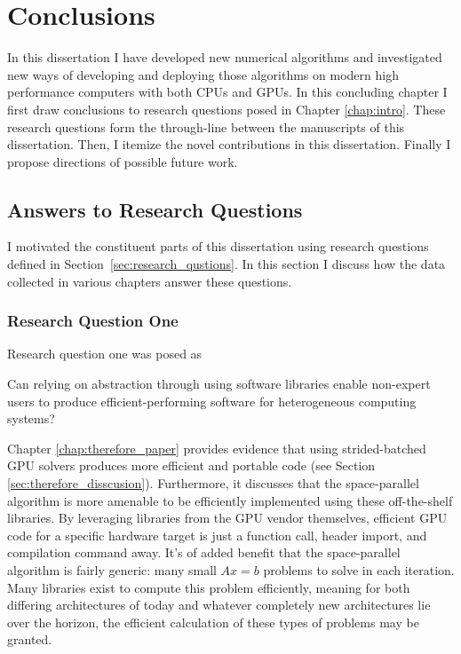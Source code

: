 
\chapter{Conclusions}
\label{chap:conclusion}


In this dissertation I have developed new numerical algorithms and investigated new ways of developing and deploying those algorithms on modern high performance computers with both CPUs and GPUs.
In this concluding chapter I first draw conclusions to research questions posed in Chapter \ref{chap:intro}.
These research questions form the through-line between the manuscripts of this dissertation.
Then, I itemize the novel contributions in this dissertation.
Finally I propose directions of possible future work.

\section{Answers to Research Questions}

I motivated the constituent parts of this dissertation using research questions defined in Section~\ref{sec:research_qustions}.
In this section I discuss how the data collected in various chapters answer these questions.

\subsection{Research Question One}

Research question one was posed as
\begin{displayquote}
Can relying on abstraction through using software libraries enable non-expert users to produce efficient-performing software for heterogeneous computing systems?
\end{displayquote}

Chapter \ref{chap:therefore_paper} provides evidence that using strided-batched GPU solvers produces more efficient and portable code (see Section \ref{sec:therefore_disscusion}).
Furthermore, it discusses that the space-parallel algorithm is more amenable to be efficiently implemented using these off-the-shelf libraries.
By leveraging libraries from the GPU vendor themselves, efficient GPU code for a specific hardware target is just a function call, header import, and compilation command away.
It's of added benefit that the space-parallel algorithm is fairly generic: many small $Ax=b$ problems to solve in each iteration.
Many libraries exist to compute this problem efficiently, meaning for both differing architectures of today and whatever completely new architectures lie over the horizon, the efficient calculation of these types of problems may be granted.

